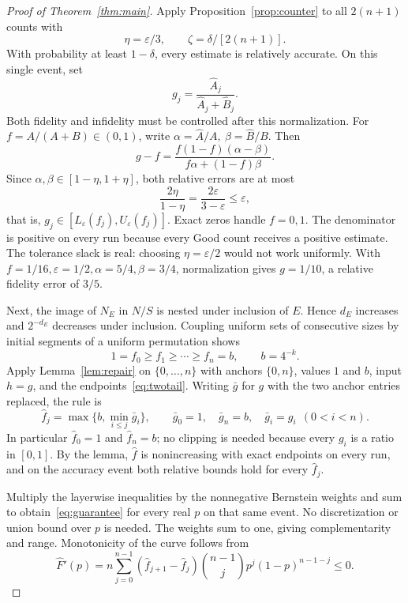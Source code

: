 \documentclass[11pt]{article}
\theoremstyle{remark}
\newcommand{\eps}{\varepsilon}
\newcommand{\Bern}[2]{\binom{#1}{#2}p^{#2}(1-p)^{#1-#2}}
\begin{document}
\begin{proof}[Proof of Theorem~\ref{thm:main}]
Apply Proposition~\ref{prop:counter} to all \(2(n+1)\) counts with
\[
 \eta=\eps/3,\qquad \zeta=\delta/[2(n+1)].
\]
With probability at least \(1-\delta\), every estimate is relatively
accurate. On this single event, set
\[
 g_j=\frac{\widehat A_j}{\widehat A_j+\widehat B_j}.
\]
Both fidelity and infidelity must be controlled after this normalization.
For \(f=A/(A+B)\in(0,1)\), write
\(\alpha=\widehat A/A,\ \beta=\widehat B/B\).
Then
\begin{equation}\label{eq:normalization}
 g-f=\frac{f(1-f)(\alpha-\beta)}
                {f\alpha+(1-f)\beta}.
\end{equation}
Since \(\alpha,\beta\in[1-\eta,1+\eta]\), both relative errors
are at most
\[
 \frac{2\eta}{1-\eta}=\frac{2\eps}{3-\eps}\le\eps,
\]
that is, \(g_j\in[L_\eps(f_j),U_\eps(f_j)]\).
Exact zeros handle \(f=0,1\). The denominator is positive on every
run because every Good count receives a positive estimate.
The tolerance slack is real: choosing \(\eta=\eps/2\) would not
work uniformly. With \(f=1/16,\eps=1/2,\alpha=5/4,\beta=3/4\),
normalization gives \(g=1/10\), a relative fidelity error of \(3/5\).

Next, the image of \(N_E\) in \(N/S\) is nested under inclusion of
\(E\). Hence \(d_E\) increases and \(2^{-d_E}\) decreases under
inclusion. Coupling uniform sets of consecutive sizes by initial
segments of a uniform permutation shows
\[
 1=f_0\ge f_1\ge\cdots\ge f_n=b,\qquad b=4^{-k}.
\]
Apply Lemma~\ref{lem:repair} on \(\{0,\ldots,n\}\) with anchors
\(\{0,n\}\), values \(1\) and \(b\), input \(h=g\), and the
endpoints~\eqref{eq:twotail}. Writing \(\bar g\) for \(g\) with the two
anchor entries replaced, the rule is
\begin{equation}\label{eq:repair}
 \widehat f_j=\max\bigl\{b,\min_{i\le j}\bar g_i\bigr\},\qquad
 \bar g_0=1,\quad \bar g_n=b,\quad \bar g_i=g_i\ \ (0<i<n).
\end{equation}
In particular \(\widehat f_0=1\) and \(\widehat f_n=b\); no clipping is
needed because every \(g_i\) is a ratio in \([0,1]\).
By the lemma, \(\widehat f\) is nonincreasing with exact endpoints on
every run, and on the accuracy event both relative bounds hold for
every \(\widehat f_j\).

Multiply the layerwise inequalities by the nonnegative Bernstein
weights and sum to obtain~\eqref{eq:guarantee} for every real \(p\)
on that same event. No discretization or union bound over \(p\) is
needed. The weights sum to one, giving complementarity and range.
Monotonicity of the curve follows from
\[
 \widehat F'(p)=n\sum_{j=0}^{n-1}
  (\widehat f_{j+1}-\widehat f_j)\Bern{n-1}{j}\le0.
\]


\end{proof}
\end{document}
